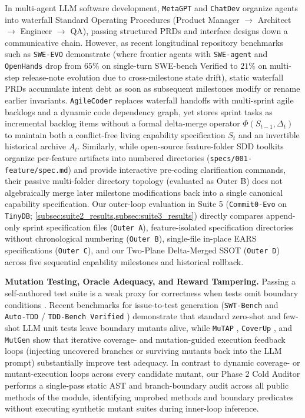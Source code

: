 \documentclass[11pt,a4paper,copyright]{google}
\begin{document}
In multi-agent LLM software development, \texttt{MetaGPT} \cite{hong2024metagpt} and \texttt{ChatDev} \cite{qian2024chatdev} organize agents into waterfall Standard Operating Procedures (Product Manager $\to$ Architect $\to$ Engineer $\to$ QA), passing structured PRDs and interface designs down a communicative chain. However, as recent longitudinal repository benchmarks such as \texttt{SWE-EVO} \cite{le2025sweevo} demonstrate (where frontier agents with \texttt{SWE-agent} and \texttt{OpenHands} \cite{wang2024openhands} drop from $65\%$ on single-turn SWE-bench Verified to $21\%$ on multi-step release-note evolution due to cross-milestone state drift), static waterfall PRDs accumulate intent debt \cite{storey2026intent} as soon as subsequent milestones modify or rename earlier invariants. \texttt{AgileCoder} \cite{nguyen2025agilecoder} replaces waterfall handoffs with multi-sprint agile backlogs and a dynamic code dependency graph, yet stores sprint tasks as incremental backlog items without a formal delta-merge operator $\Phi(S_{t-1}, \Delta_t)$ to maintain both a conflict-free living capability specification $S_t$ and an invertible historical archive $A_t$. Similarly, while open-source feature-folder SDD toolkits organize per-feature artifacts into numbered directories (\texttt{specs/001-feature/spec.md}) and provide interactive pre-coding clarification commands, their passive multi-folder directory topology (evaluated as Outer B) does not algebraically merge later milestone modifications back into a single canonical capability specification. Our outer-loop evaluation in Suite 5 (\texttt{Commit0-Evo} on \texttt{TinyDB}; \cref{subsec:suite2_results,subsec:suite3_results}) directly compares append-only sprint specification files (\texttt{Outer A}), feature-isolated specification directories without chronological numbering (\texttt{Outer B}), single-file in-place EARS specifications (\texttt{Outer C}), and our Two-Plane Delta-Merged SSOT (\texttt{Outer D}) across five sequential capability milestones and historical rollback.

\textbf{Mutation Testing, Oracle Adequacy, and Reward Tampering.} Passing a self-authored test suite is a weak proxy for correctness when tests omit boundary conditions \cite{offutt1996sufficient,jia2011mutation,papadakis2019mutation}. Recent benchmarks for issue-to-test generation (\texttt{SWT-Bench} \cite{mundler2024swtbench} and \texttt{Auto-TDD} / \texttt{TDD-Bench Verified} \cite{ahmed2024tddbench}) demonstrate that standard zero-shot and few-shot LLM unit tests leave boundary mutants alive, while \texttt{MuTAP} \cite{dakhel2024mutap}, \texttt{CoverUp} \cite{pizzorno2025coverup}, and \texttt{MutGen} \cite{wang2025mutgen} show that iterative coverage- and mutation-guided execution feedback loops (injecting uncovered branches or surviving mutants back into the LLM prompt) substantially improve test adequacy. In contrast to dynamic coverage- or mutant-execution loops across every candidate mutant, our Phase 2 Cold Auditor performs a single-pass static AST and branch-boundary audit across all public methods of the module, identifying unprobed methods and boundary predicates without executing synthetic mutant suites during inner-loop inference.
\end{document}
